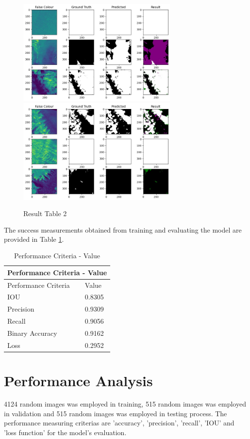 \documentclass[conference]{IEEEtran}
\begin{document}
\begin{figure}[htp]
    \centering
    \includegraphics[width=8cm]{images/result2.png}
    \includegraphics[width=8cm]{images/result3.png}
    \caption{Result Table 2}
    \label{res2}
\end{figure}

The success measurements obtained from training and evaluating the model are provided in Table \ref{resultTable}.
\begin{table}[!htp]

    \begin{tabular}{ |p{6cm}||p{2cm}|}
     \hline
     \multicolumn{2}{|c|}{Performance Criteria - Value} \\
     \hline
     Performance Criteria & Value\\
     \hline
     \hline
     IOU     &   0.8305\\
     \hline
     Precision   &     0.9309\\
     \hline
     Recall  &  0.9056\\
     \hline
     Binary Accuracy       &     0.9162\\
     \hline
     Loss &   0.2952\\
     \hline
    \end{tabular}

    \caption{Performance Criteria - Value}
    \label{resultTable}
\end{table}

\section{Performance Analysis}
4124 random images was employed in training, 515 random images was employed in validation and 515 random images was employed in testing process. The performance measuring criterias are 'accuracy', 'precision', 'recall', 'IOU' and 'loss function' for the model's evaluation. 
\end{document}
